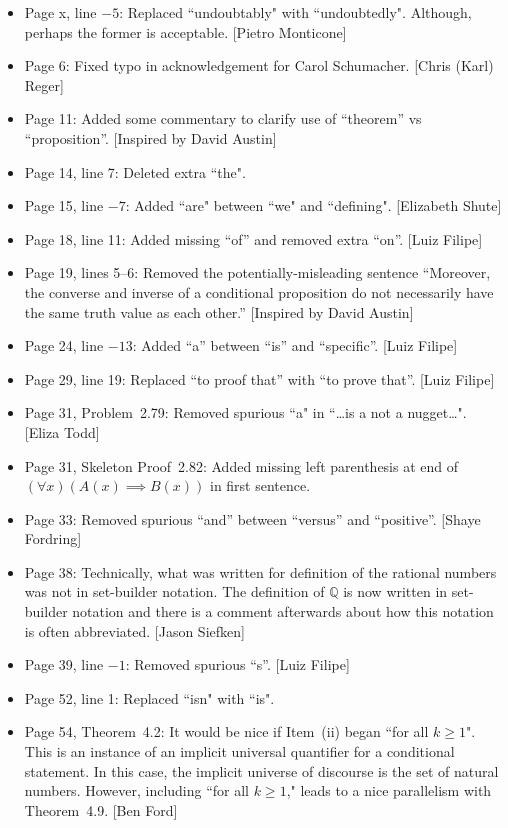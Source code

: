 \documentclass[11pt]{article}%
\begin{document}
\begin{itemize}
\item Page x, line $-5$: Replaced ``undoubtably" with ``undoubtedly". Although, perhaps the former is acceptable. [Pietro Monticone]
\item Page 6: Fixed typo in acknowledgement for Carol Schumacher. [Chris (Karl) Reger]
\item Page 11: Added some commentary to clarify use of ``theorem'' vs ``proposition''. [Inspired by David Austin]
\item Page 14, line 7: Deleted extra ``the".
\item Page 15, line $-7$: Added ``are" between ``we" and ``defining". [Elizabeth Shute]
\item Page 18, line 11: Added missing ``of'' and removed extra ``on''. [Luiz Filipe]
\item Page 19, lines 5--6: Removed the potentially-misleading sentence ``Moreover, the converse and inverse of a conditional proposition do not necessarily have the same truth value as each other.'' [Inspired by David Austin]
\item Page 24, line $-13$: Added ``a'' between ``is'' and ``specific''. [Luiz Filipe]
\item Page 29, line 19: Replaced ``to proof that'' with ``to prove that''. [Luiz Filipe]
\item Page 31, Problem~2.79: Removed spurious ``a" in ``\ldots is a not a nugget\ldots". [Eliza Todd]
\item Page 31, Skeleton Proof~2.82: Added missing left parenthesis at end of $(\forall x)(A(x)\implies B(x))$ in first sentence.
\item Page 33: Removed spurious ``and'' between ``versus'' and ``positive''. [Shaye Fordring]
\item Page 38: Technically, what was written for definition of the rational numbers was not in set-builder notation. The definition of $\mathbb{Q}$ is now written in set-builder notation and there is a comment afterwards about how this notation is often abbreviated. [Jason Siefken]
\item Page 39, line $-1$: Removed spurious ``s''. [Luiz Filipe]
\item Page 52, line 1: Replaced ``isn" with ``is".
\item Page 54, Theorem~4.2: It would be nice if Item~(ii) began ``for all $k\geq 1$".  This is an instance of an implicit universal quantifier for a conditional statement.  In this case, the implicit universe of discourse is the set of natural numbers.  However, including ``for all $k\geq 1$," leads to a nice parallelism with Theorem~4.9. [Ben Ford]

\end{itemize}
\end{document}
